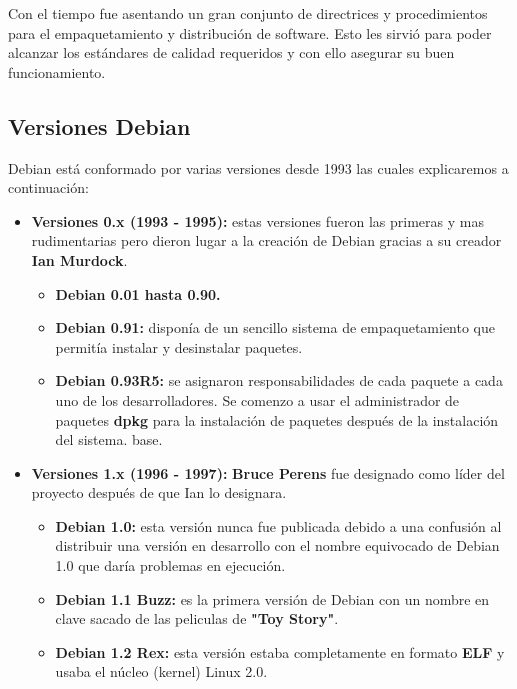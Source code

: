 \documentclass[a4paper, 12pt]{book}
\begin{document}
Con el tiempo fue asentando un gran conjunto de directrices y procedimientos para el empaquetamiento y distribución de software. Esto les sirvió para poder alcanzar los estándares de calidad requeridos y con ello asegurar su buen funcionamiento.

\subsection{Versiones Debian}
\label{subsec:versiones debian}

Debian está conformado por varias versiones desde 1993 las cuales explicaremos a continuación:

\begin{itemize}

	\item \textbf {Versiones 0.x (1993 - 1995):} estas versiones fueron las primeras y mas rudimentarias pero dieron lugar a la creación de Debian gracias a su creador \textbf {Ian Murdock}.
	\begin{itemize}
		\item \textbf {Debian 0.01 hasta 0.90.}
		\item \textbf {Debian 0.91:} disponía de un sencillo sistema de empaquetamiento que permitía instalar y desinstalar paquetes.
		\item \textbf {Debian 0.93R5:}  se asignaron responsabilidades de cada paquete a cada uno de los desarrolladores. Se comenzo a usar el administrador de paquetes \textbf {dpkg} para la instalación de paquetes después de la instalación del sistema.
		base.
	\end{itemize}
	\item \textbf {Versiones 1.x (1996 - 1997):} \textbf{Bruce Perens} fue designado como líder del proyecto después de que Ian lo designara.
	\begin{itemize}
		\item \textbf {Debian 1.0:} esta versión nunca fue publicada debido a una confusión al distribuir una versión en desarrollo con el nombre equivocado de Debian 1.0 que daría problemas en ejecución.
		\item \textbf {Debian 1.1 Buzz: } es la primera versión de Debian con un nombre en clave sacado de las peliculas de \textbf {"Toy Story"}.
		\item \textbf {Debian 1.2 Rex: } esta versión estaba completamente en formato \textbf{ELF} y usaba el núcleo (kernel) Linux 2.0.
		

\end{itemize}
\end{itemize}
\end{document}
